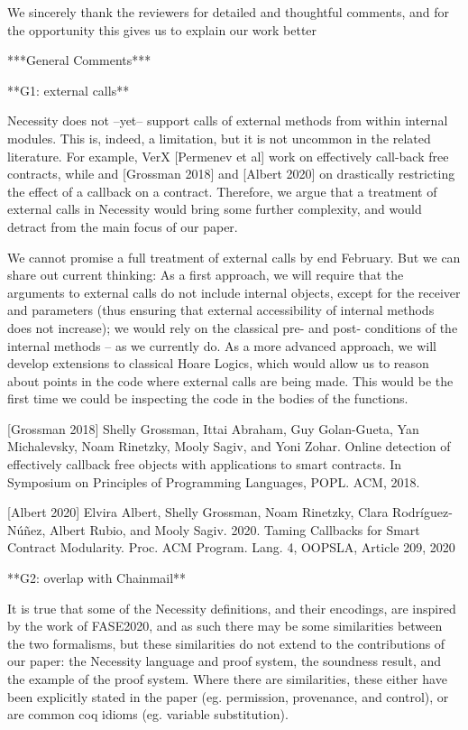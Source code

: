 We sincerely thank the reviewers for detailed and thoughtful comments, and for the opportunity this gives us to explain our work better

***General Comments***

**G1: external calls**

Necessity does not --yet-- support calls of external methods from within internal modules. This is, indeed, a limitation, but it is not uncommon in the related literature. For example, VerX [Permenev et al] work on effectively call-back free contracts, while and [Grossman 2018] and  [Albert 2020] on drastically restricting the effect of a callback on a contract. Therefore, we argue that a treatment of  external calls in Necessity would bring some further complexity, and would  detract from the main focus of our paper.  

We cannot promise a full treatment of external calls by end February. But we can share out current thinking:  As a first approach, we will require that the arguments to external calls do not include internal objects, except for the receiver and parameters (thus ensuring that external accessibility of internal methods does not increase); we would rely on the classical pre- and post- conditions of the internal methods -- as we currently do. As a more advanced approach, we will develop extensions to classical Hoare Logics, which would allow us to reason about points in the code where external calls are being made. This would be the first time we could be inspecting the code in the bodies of the functions.

[Grossman 2018] Shelly Grossman, Ittai Abraham, Guy Golan-Gueta, Yan Michalevsky, Noam Rinetzky, Mooly Sagiv, and Yoni Zohar. Online detection of effectively callback free objects with applications to smart contracts. In Symposium on Principles of Programming Languages, POPL. ACM, 2018.

[Albert 2020] Elvira Albert, Shelly Grossman, Noam Rinetzky, Clara Rodríguez-Núñez, Albert Rubio, and Mooly Sagiv. 2020. Taming Callbacks for Smart Contract Modularity. Proc. ACM Program. Lang. 4, OOPSLA, Article 209, 2020


**G2:  overlap with Chainmail**

 It is true that some of the Necessity definitions, and their encodings, are inspired by the work of FASE2020, 
and as such there may be some similarities between the two formalisms, but these similarities do not extend to the contributions of our paper: the Necessity language and proof system, 
the soundness result, and the example of the proof system. Where there are similarities, these either have been explicitly stated in the paper (eg. permission, provenance, and control),
or are common coq idioms (eg. variable substitution).


